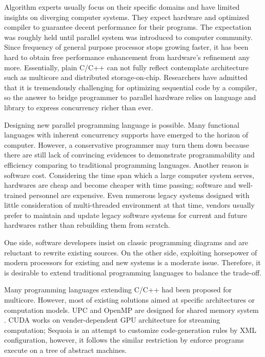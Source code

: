 \documentclass[10pt, conference, compsocconf]{IEEEtran}
\begin{document}
Algorithm experts usually focus on their specific domains and have limited insights on diverging computer systems. They expect hardware and optimized compiler to guarantee decent performance for their programs. The expectation was roughly held until parallel system was introduced to computer community. Since frequency of general purpose processor stops growing faster, it has been hard to obtain free performance enhancement from hardware's refinement any more. Essentially, plain C/C++ can not fully reflect contemplate architecture such as multicore and distributed storage-on-chip. Researchers have admitted that it is tremendously challenging for optimizing sequential code by a compiler, so the answer to bridge programmer to parallel hardware relies on language and library to express concurrency richer than ever.

Designing new parallel programming language is possible. Many functional languages \cite{b13} with inherent concurrency supports have emerged to the horizon of computer. However, a conservative programmer may turn them down because there are still lack of convincing evidences to demonstrate programmability and efficiency comparing to traditional programming languages. Another reason is software cost. Considering the time span which a large computer system serves, hardwares are cheap and become cheaper with time passing; software and well-trained personnel are expensive. Even numerous legacy systems designed with little consideration of multi-threaded environment at that time, vendors usually prefer to maintain and update legacy software systems for current and future hardwares rather than rebuilding them from scratch. 

One side, software developers insist on classic programming diagrams and are reluctant to rewrite existing sources. On the other side, exploiting horsepower of modern processors for existing and new systems is a moderate issue. Therefore, it is desirable to extend traditional programming languages to balance the trade-off.

Many programming languages extending C/C++ had been proposed for multicore. However, most of existing solutions aimed at specific architectures or computation models. UPC and OpenMP are designed for shared memory system \cite{b15}. CUDA works on vender-dependent GPU architecture for streaming computation; Sequoia \cite{b1} is an attempt to customize code-generation rules by XML configuration, however, it follows the similar restriction by enforce programs execute on a tree of abstract machines.
\end{document}
